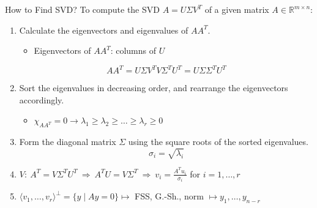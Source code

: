 \documentclass[fullscreen=true, bookmarks=true, hyperref={pdfencoding=unicode}]{beamer}
\begin{document}
\begin{frame}{How to Find SVD?}
  To compute the SVD $A = U\Sigma V^T$ of a given matrix $A \in \mathbb{R}^{m \times n}$:

  \begin{enumerate}
    \pause\item Calculate the eigenvectors and eigenvalues of $AA^T$.
      \begin{itemize}
        \item Eigenvectors of $AA^T$: columns of $U$
      \end{itemize}

      $$ AA^T = U\Sigma V^T V\Sigma^T U^T = U\Sigma \Sigma^T U^T$$


    \pause\item Sort the eigenvalues in decreasing order, and rearrange the eigenvectors accordingly.
      \begin{itemize}
        \item $\chi_{AA^T} = 0 \to \lambda_1 \geq \lambda_2 \geq \ldots \geq \lambda_r \geq 0$
      \end{itemize}

    \pause\item Form the diagonal matrix $\Sigma$ using the square roots of the sorted eigenvalues.
      \[
      \sigma_{i} = \sqrt{\lambda_i}
      \]

    \pause\item $V:\ A^T = V\Sigma^T U^T\ \Rightarrow\ A^TU = V\Sigma^T \ \Rightarrow\ v_i = \frac{A^Tu_i}{\sigma_i}$ for $i = 1, \dots, r$
    \pause\item $\langle v_1, \dots, v_r\rangle^\perp = \{ y \mid Ay=0\} \mapsto $ FSS, G.-Sh., norm $\mapsto y_1, \dots, y_{n-r}$
  \end{enumerate}

\end{frame}
\end{document}
